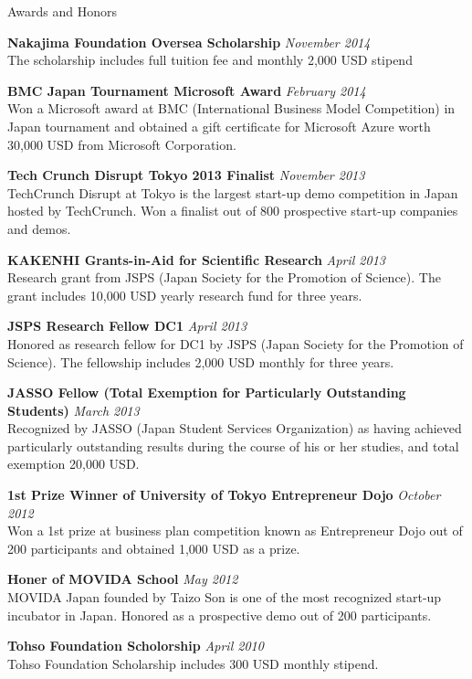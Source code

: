 \documentclass{resume} %
\begin{document}
\begin{rSection}{Awards and Honors}

{\bf Nakajima Foundation Oversea Scholarship} \hfill {\em November 2014} \\
The scholarship includes full tuition fee and monthly 2,000 USD stipend

{\bf BMC Japan Tournament Microsoft Award} \hfill {\em February 2014} \\
Won a Microsoft award at BMC (International Business Model Competition) in Japan tournament and obtained a gift certificate for Microsoft Azure worth 30,000 USD from Microsoft Corporation.

{\bf Tech Crunch Disrupt Tokyo 2013 Finalist} \hfill {\em November 2013} \\
TechCrunch Disrupt at Tokyo is the largest start-up demo competition in Japan hosted by TechCrunch.
Won a finalist out of 800 prospective start-up companies and demos.

{\bf KAKENHI Grants-in-Aid for Scientific Research} \hfill {\em April 2013} \\
Research grant from JSPS (Japan Society for the Promotion of Science).
The grant includes 10,000 USD yearly research fund for three years.

{\bf JSPS Research Fellow DC1} \hfill {\em April 2013} \\
Honored as research fellow for DC1 by JSPS (Japan Society for the Promotion of Science).
The fellowship includes 2,000 USD monthly for three years.

{\bf JASSO Fellow (Total Exemption for Particularly Outstanding Students) } \hfill {\em March 2013} \\
Recognized by JASSO (Japan Student Services Organization) as having achieved particularly outstanding results during the course of his or her studies, and total exemption 20,000 USD.

{\bf 1st Prize Winner of University of Tokyo Entrepreneur Dojo} \hfill {\em October 2012} \\
Won a 1st prize at business plan competition known as Entrepreneur Dojo out of 200 participants and obtained 1,000 USD as a prize.

{\bf Honer of MOVIDA School} \hfill {\em May 2012} \\
MOVIDA Japan founded by Taizo Son is one of the most recognized start-up incubator in Japan.
Honored as a prospective demo out of 200 participants.

{\bf Tohso Foundation Scholorship} \hfill {\em April 2010} \\
Tohso Foundation Scholarship includes 300 USD monthly stipend.

\end{rSection}
\end{document}
